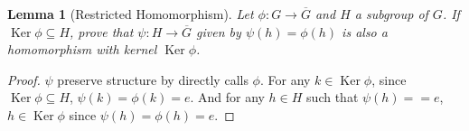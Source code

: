 \documentclass[14pt]{extarticle}
\newtheorem{lemma}{Lemma}[section]
\DeclareMathOperator{\Ker}{Ker}
\newcommand{\1}{\{e\}}
\begin{document}
\begin{lemma}[Restricted Homomorphism]
  Let $\phi : G \rightarrow \overline{G}$ and $H$ a subgroup of $G$.
  If $\Ker \phi \subseteq H$, prove that $\psi : H \rightarrow \overline{G}$
  given by $\psi(h) = \phi(h)$ is also a homomorphism with kernel $\Ker \phi$.
\end{lemma}
\begin{proof}
  $\psi$ preserve structure by directly calls $\phi$.
  For any $k \in \Ker \phi$, since $\Ker \phi \subseteq H$,
  $\psi(k) = \phi(k) = e$.
  And for any $h \in H$ such that $\psi(h) = = e$, $h \in \Ker \phi$
  since $\psi(h) = \phi(h) = e$.
\end{proof}
\end{document}
